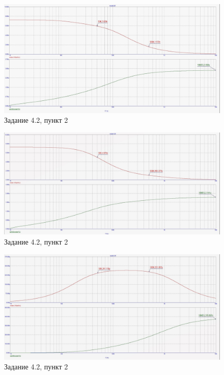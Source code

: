 \documentclass[a4paper, 14pt]{extarticle}%
\begin{document}
\begin{figure}[h!]
			\centering
			\includegraphics[width=1.1\linewidth]{4/4_2_3.jpg}
			\caption{Задание 4.2, пункт 2}
			\label{A}
\end{figure}



\begin{figure}[h!]
			\centering
			\includegraphics[width=1.1\linewidth]{4/4_2_5.jpg}
			\caption{Задание 4.2, пункт 2}
			\label{A}
\end{figure}




\begin{figure}[h!]
			\centering
			\includegraphics[width=1.1\linewidth]{4/4_2_4.jpg}
			\caption{Задание 4.2, пункт 2}
			\label{A}
\end{figure}
\end{document}
